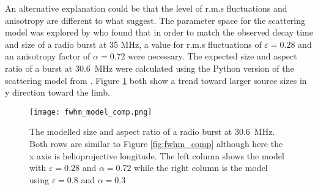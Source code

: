 An alternative explanation could be that the level of r.m.s fluctuations and anisotropy are different to what \cite{Kontar2019} suggest. The parameter space for the scattering model was explored by \cite{Zhang2021} who found that in order to match the observed decay time and size of a radio burst at 35 MHz, a value for r.m.s fluctuations of $\varepsilon = 0.28$ and an anisotropy factor of $\alpha = 0.72$ were necessary. The expected size and aspect ratio of a burst at 30.6~MHz were calculated using the Python version of the \cite{Kontar2019} scattering model from \cite{Zhang2021}. Figure \ref{fig:model_comp} both show a trend toward larger source sizes in y direction toward the limb.

\begin{figure}[ht]
\centering
\texttt{[image: fwhm\_model\_comp.png]}
\caption[The modelled size and aspect ratio of a radio burst at 30.6~MHz]{The modelled size and aspect ratio of a radio burst at 30.6~MHz. Both rows are similar to Figure \ref{fig:fwhm_comp} although here the x axis is helioprojective longitude. The left column shows the model with $\varepsilon = 0.28$ and $\alpha = 0.72$ while the right column is the model using $\varepsilon = 0.8$ and $\alpha = 0.3$}
\label{fig:model_comp}
\end{figure}


